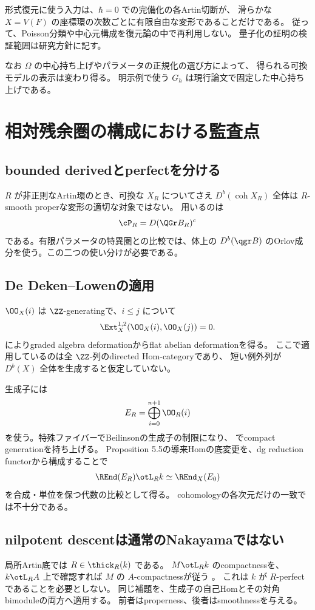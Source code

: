 形式復元に使う入力は、\(\hbar=0\) での完備化の各Artin切断が、
滑らかな \(X=V(F)\) の座標環の次数ごとに有限自由な変形であることだけである。
従って、Poisson分類や中心元構成を復元論の中で再利用しない。
量子化の証明の検証範囲は研究方針に記す。

なお \(\Omega\) の中心持ち上げやパラメータの正規化の選び方によって、
得られる可換モデルの表示は変わり得る。
明示例で使う \(G_h\) は現行論文で固定した中心持ち上げである。

\section{相対残余圏の構成における監査点}

\subsection{bounded derivedとperfectを分ける}

\(R\) が非正則なArtin環のとき、可換な \(X_R\) についてさえ
\(D^b(\operatorname{coh}X_R)\) 全体は \(R\)-smooth properな変形の適切な対象ではない。
用いるのは
\[
 \cP_R=D(\QGr B_R)^c
\]
である。有限パラメータの特異圏との比較では、体上の
\(D^b(\qgr B)\) のOrlov成分を使う。この二つの使い分けが必要である。

\subsection{De Deken--Lowenの適用}

\(\OO_X(i)\) は \(\ZZ\)-generatingで、\(i\le j\) について
\[
 \Ext_X^{1,2}(\OO_X(i),\OO_X(j))=0.
\]
\cite[Theorem 4.5]{DDL} によりgraded algebra deformationからflat abelian deformationを得る。
ここで適用しているのは全 \(\ZZ\)-列のdirected Hom-categoryであり、
短い例外列が \(D^b(X)\) 全体を生成すると仮定していない。

生成子には
\[
 E_R=\bigoplus_{i=0}^{n+1}\OO_R(i)
\]
を使う。特殊ファイバーでBeilinsonの生成子の制限になり、
\cite[Propositions 5.8--5.9]{DDL} でcompact generationを持ち上げる。
Proposition 5.5の導来Homの底変更を、dg reduction functorから構成することで
\[
 \REnd(E_R)\otL_Rk\simeq\REnd_X(E_0)
\]
を合成・単位を保つ代数の比較として得る。
cohomologyの各次元だけの一致では不十分である。

\subsection{nilpotent descentは通常のNakayamaではない}

局所Artin底では \(R\in\thick_R(k)\) である。
\(M\otL_Rk\) のcompactnessを、\(k\otL_R A\) 上で確認すれば
\(M\) の \(A\)-compactnessが従う \cite{Mathew}。
これは \(k\) が \(R\)-perfectであることを必要としない。
同じ補題を、生成子の自己Homとその対角bimoduleの両方へ適用する。
前者はproperness、後者はsmoothnessを与える。

